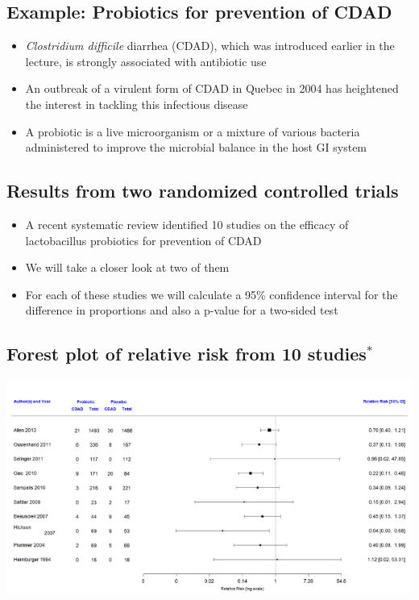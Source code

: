 \documentclass[
]{book}
\providecommand{\tightlist}{%
  \setlength{\itemsep}{0pt}\setlength{\parskip}{0pt}}
\begin{document}
\hypertarget{example-probiotics-for-prevention-of-cdad}{%
\subsection{Example: Probiotics for prevention of CDAD}\label{example-probiotics-for-prevention-of-cdad}}

\begin{itemize}
\tightlist
\item
  \emph{Clostridium difficile} diarrhea (CDAD), which was introduced earlier in the lecture, is strongly associated with antibiotic use
\item
  An outbreak of a virulent form of CDAD in Quebec in 2004 has heightened the interest in tackling this infectious disease
\item
  A probiotic is a live microorganism or a mixture of various bacteria administered to improve the microbial balance in the host GI system
\end{itemize}

\hypertarget{results-from-two-randomized-controlled-trials}{%
\subsection{Results from two randomized controlled trials}\label{results-from-two-randomized-controlled-trials}}

\begin{itemize}
\tightlist
\item
  A recent systematic review identified 10 studies on the efficacy of lactobacillus probiotics for prevention of CDAD
\item
  We will take a closer look at two of them
\item
  For each of these studies we will calculate a 95\% confidence interval for the difference in proportions and also a p-value for a two-sided test
\end{itemize}

\hypertarget{forest-plot-of-relative-risk-from-10-studies}{%
\subsection{\texorpdfstring{Forest plot of relative risk from 10 studies\(^*\)}{Forest plot of relative risk from 10 studies\^{}*}}\label{forest-plot-of-relative-risk-from-10-studies}}

\includegraphics[width=1\linewidth]{./7_42}
\end{document}
